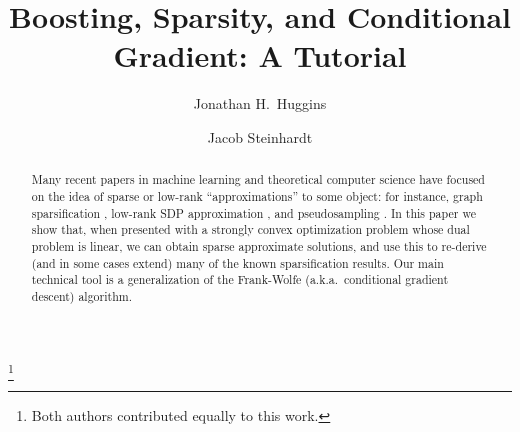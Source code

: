 \documentclass[reqno,oneside,a4paper]{amsart}
\begin{document}
 

\title{Boosting, Sparsity, and Conditional Gradient: A Tutorial}
	   
\thanks{Both authors contributed equally to this work.}

\author[J.~H.~Huggins]{Jonathan H.~Huggins}
\address{Massachusetts Institute of Technology}

\author[J.~Steinhardt]{Jacob Steinhardt}
\address{Stanford University}


\begin{abstract} 
Many recent papers in machine learning and theoretical computer science have 
focused on the idea of sparse or low-rank ``approximations'' to some object: 
for instance, graph sparsification \citep{deCarliSilva:2011}, low-rank SDP approximation \citep{Arora:2007}, 
and pseudosampling \citep{Welling:2009a,Chen:2010a}. In this paper we show that, when presented with 
a strongly convex optimization problem whose dual problem is linear, we can obtain 
sparse approximate solutions, and use this to re-derive (and in some cases 
extend) many of the known sparsification results. Our main technical tool
is a generalization of the Frank-Wolfe (a.k.a.\ conditional gradient 
descent) algorithm. 
\end{abstract} 

\maketitle



%







\end{document}
